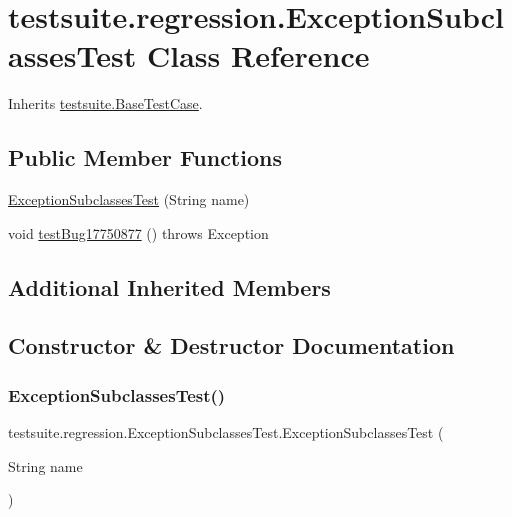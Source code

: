 \hypertarget{classtestsuite_1_1regression_1_1_exception_subclasses_test}{}\section{testsuite.\+regression.\+Exception\+Subclasses\+Test Class Reference}
\label{classtestsuite_1_1regression_1_1_exception_subclasses_test}


Inherits \mbox{\hyperlink{classtestsuite_1_1_base_test_case}{testsuite.\+Base\+Test\+Case}}.

\subsection*{Public Member Functions}
\begin{DoxyCompactItemize}
\item 
\mbox{\hyperlink{classtestsuite_1_1regression_1_1_exception_subclasses_test_a028745d5ed391f13e14f8238066ee2d8}{Exception\+Subclasses\+Test}} (String name)
\item 
void \mbox{\hyperlink{classtestsuite_1_1regression_1_1_exception_subclasses_test_a2eb17ba3714d3c08bb6403410dc77880}{test\+Bug17750877}} ()  throws Exception 
\end{DoxyCompactItemize}
\subsection*{Additional Inherited Members}


\subsection{Constructor \& Destructor Documentation}
\mbox{\label{classtestsuite_1_1regression_1_1_exception_subclasses_test_a028745d5ed391f13e14f8238066ee2d8}} 
\subsubsection{\texorpdfstring{Exception\+Subclasses\+Test()}{ExceptionSubclassesTest()}}
{\footnotesize\ttfamily testsuite.\+regression.\+Exception\+Subclasses\+Test.\+Exception\+Subclasses\+Test (\begin{DoxyParamCaption}\item[{String}]{name }\end{DoxyParamCaption})}


